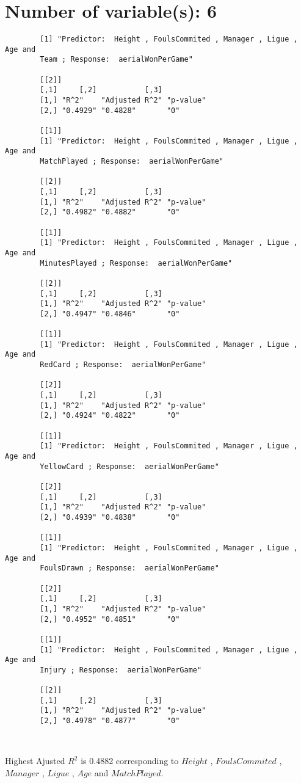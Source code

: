 \documentclass[12pt]{article}
\begin{document}
	\section{Number of variable(s): 6}
	\begin{verbatim}
		[1] "Predictor:  Height , FoulsCommited , Manager , Ligue , Age and 
		Team ; Response:  aerialWonPerGame"
		
		[[2]]
		[,1]     [,2]           [,3]     
		[1,] "R^2"    "Adjusted R^2" "p-value"
		[2,] "0.4929" "0.4828"       "0"      
		
		[[1]]
		[1] "Predictor:  Height , FoulsCommited , Manager , Ligue , Age and 
		MatchPlayed ; Response:  aerialWonPerGame"
		
		[[2]]
		[,1]     [,2]           [,3]     
		[1,] "R^2"    "Adjusted R^2" "p-value"
		[2,] "0.4982" "0.4882"       "0"      
		
		[[1]]
		[1] "Predictor:  Height , FoulsCommited , Manager , Ligue , Age and 
		MinutesPlayed ; Response:  aerialWonPerGame"
		
		[[2]]
		[,1]     [,2]           [,3]     
		[1,] "R^2"    "Adjusted R^2" "p-value"
		[2,] "0.4947" "0.4846"       "0"      
		
		[[1]]
		[1] "Predictor:  Height , FoulsCommited , Manager , Ligue , Age and 
		RedCard ; Response:  aerialWonPerGame"
		
		[[2]]
		[,1]     [,2]           [,3]     
		[1,] "R^2"    "Adjusted R^2" "p-value"
		[2,] "0.4924" "0.4822"       "0"      
		
		[[1]]
		[1] "Predictor:  Height , FoulsCommited , Manager , Ligue , Age and 
		YellowCard ; Response:  aerialWonPerGame"
		
		[[2]]
		[,1]     [,2]           [,3]     
		[1,] "R^2"    "Adjusted R^2" "p-value"
		[2,] "0.4939" "0.4838"       "0"      
		
		[[1]]
		[1] "Predictor:  Height , FoulsCommited , Manager , Ligue , Age and 
		FoulsDrawn ; Response:  aerialWonPerGame"
		
		[[2]]
		[,1]     [,2]           [,3]     
		[1,] "R^2"    "Adjusted R^2" "p-value"
		[2,] "0.4952" "0.4851"       "0"      
		
		[[1]]
		[1] "Predictor:  Height , FoulsCommited , Manager , Ligue , Age and 
		Injury ; Response:  aerialWonPerGame"
		
		[[2]]
		[,1]     [,2]           [,3]     
		[1,] "R^2"    "Adjusted R^2" "p-value"
		[2,] "0.4978" "0.4877"       "0"      
		
		
	\end{verbatim}
		Highest Ajusted $ R^2 $ is 0.4882 corresponding to $ Height $ , $ FoulsCommited $ , $ Manager $ , $ Ligue $ , $ Age $ and 
		$ MatchPlayed $.
	
\end{document}
